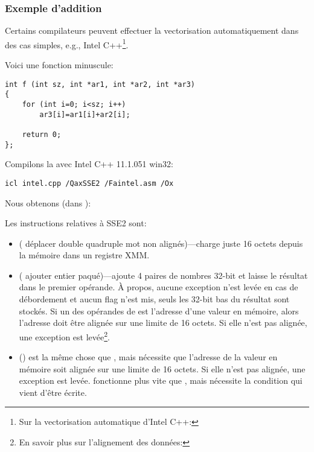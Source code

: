 \subsubsection{Exemple d'addition}


Certains compilateurs peuvent effectuer la vectorisation automatiquement dans des
cas simples, e.g., Intel C++\footnote{Sur la vectorisation automatique d'Intel C++:
\URLINTELVEC}.

Voici une fonction minuscule:

\begin{lstlisting}[style=customc]
int f (int sz, int *ar1, int *ar2, int *ar3)
{
	for (int i=0; i<sz; i++)
		ar3[i]=ar1[i]+ar2[i];

	return 0;
};
\end{lstlisting}


Compilons la avec Intel C++ 11.1.051 win32:

\begin{verbatim}
icl intel.cpp /QaxSSE2 /Faintel.asm /Ox
\end{verbatim}

Nous obtenons (dans \IDA):



Les instructions relatives à SSE2 sont:
\begin{itemize}
\item
\MOVDQU ( déplacer double quadruple mot non
alignés)---charge juste 16 octets depuis la mémoire dans un registre XMM.

\item
\PADDD ( ajouter entier paqué)---ajoute 4 paires de nombres
32-bit et laisse le résultat dans le premier opérande.
À propos, aucune exception n'est levée en cas de débordement et aucun flag n'est mis,
seuls les 32-bit bas du résultat sont stockés.
Si un des opérandes de \PADDD est l'adresse d'une valeur en mémoire, alors l'adresse
doit être alignée sur une limite de 16 octets.
Si elle n'est pas alignée, une exception est levée\footnote{En savoir plus sur l'alignement
des données: \URLWPDA}.

\item
\MOVDQA () est la même chose que \MOVDQU, mais nécessite
que l'adresse de la valeur en mémoire soit alignée sur une limite de 16 octets. Si
elle n'est pas alignée, une exception est levée.
\MOVDQA fonctionne plus vite que \MOVDQU, mais nécessite la condition qui vient d'être
écrite.

\end{itemize}

